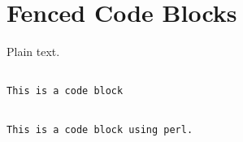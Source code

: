 
\def\mytitle{MultiMarkdown Fenced Code Blocks Test}
\def\latexmode{memoir}


\chapter{Fenced Code Blocks}
\label{fencedcodeblocks}

Plain text.

\begin{adjustwidth}{2.5em}{2.5em}
\begin{verbatim}

This is a code block

\end{verbatim}
\end{adjustwidth}

\begin{adjustwidth}{2.5em}{2.5em}
\begin{verbatim}

This is a code block using perl.

\end{verbatim}
\end{adjustwidth}




